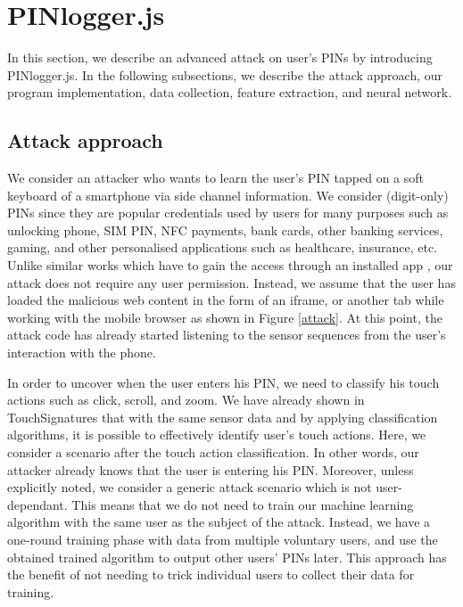 \documentclass[10pt,twocolumn]{article}
\begin{document}
\section{PINlogger.js}
\label{logger}
In this section, we describe an  advanced attack on user's PINs by introducing PINlogger.js. In the following subsections, we describe the attack approach, our program implementation, data collection, feature extraction, and neural network. 

\subsection{Attack approach}
We consider an attacker who wants to learn the user's PIN tapped on a soft keyboard of a smartphone via side channel information. We consider (digit-only) PINs since they are popular credentials used by users for many purposes such as unlocking phone, SIM PIN, NFC payments, bank cards, other banking services, gaming, and other personalised applications such as healthcare, insurance, etc.  
Unlike similar works which have to gain the access through an installed app \cite{Speech:Gyr,accessory,Tapprints,touchlogger,PINCamera,SkimLight,KeyMic,taplogger,Tapprints2,Motionattack}, our attack does not require any user permission. Instead, we assume that the user has loaded the malicious web content in the form of an iframe, or another tab while working with the mobile browser as shown in Figure \ref{attack}. At this point, the attack code has already started listening to the sensor sequences from the user's interaction with the phone. 

In order to uncover when the user enters his PIN, we need to classify his touch actions such as click, scroll, and zoom. We  have already shown in TouchSignatures \cite{Mehrnezhad} that with the same sensor data and by applying classification algorithms, it is possible to effectively identify user's touch actions. Here, we consider a scenario after the touch action classification. In other words, our attacker already knows that the user is entering his PIN.
Moreover, unless explicitly noted, we consider a generic attack scenario which is not user-dependant. This means that we do not need to train our machine learning algorithm with the same user as the subject of the attack. Instead, we have a one-round training phase with data from multiple voluntary users, and use the obtained trained algorithm to output other users' PINs later. This approach has the benefit of not needing to trick individual users to collect their data for training. 
\end{document}
